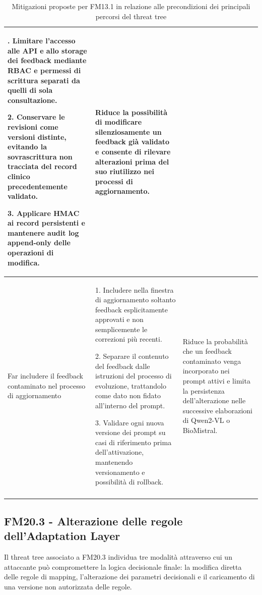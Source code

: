 {\begin{xltabular}{\textwidth}{
    >{\raggedright\arraybackslash}p{3.1cm}
    X
    X
}
1. Limitare l'accesso alle API e allo storage dei feedback mediante RBAC e
permessi di scrittura separati da quelli di sola consultazione.

2. Conservare le revisioni come versioni distinte, evitando la sovrascrittura
non tracciata del record clinico precedentemente validato.

3. Applicare HMAC ai record persistenti e mantenere audit log append-only
delle operazioni di modifica. &

Riduce la possibilità di modificare silenziosamente un feedback già validato
e consente di rilevare alterazioni prima del suo riutilizzo nei processi di
aggiornamento. \\

\midrule


Far includere il feedback contaminato nel processo di aggiornamento &

1. Includere nella finestra di aggiornamento soltanto feedback esplicitamente
approvati e non semplicemente le correzioni più recenti.

2. Separare il contenuto del feedback dalle istruzioni del processo di
evoluzione, trattandolo come dato non fidato all'interno del prompt.

3. Validare ogni nuova versione dei prompt su casi di riferimento prima
dell'attivazione, mantenendo versionamento e possibilità di rollback. &

Riduce la probabilità che un feedback contaminato venga incorporato nei prompt
attivi e limita la persistenza dell'alterazione nelle successive elaborazioni
di Qwen2-VL o BioMistral. \\

\bottomrule

\caption{Mitigazioni proposte per FM13.1 in relazione alle precondizioni dei principali percorsi del threat tree}

\label{tab:mitigazioni-fm13-1}\\

\end{xltabular}
}

\subsection{FM20.3 - Alterazione delle regole dell'Adaptation Layer}
Il threat tree associato a FM20.3 individua tre modalità attraverso cui un attaccante può compromettere la logica decisionale finale: la modifica diretta delle regole di mapping, l'alterazione dei parametri decisionali e il caricamento di una versione non autorizzata delle regole.

